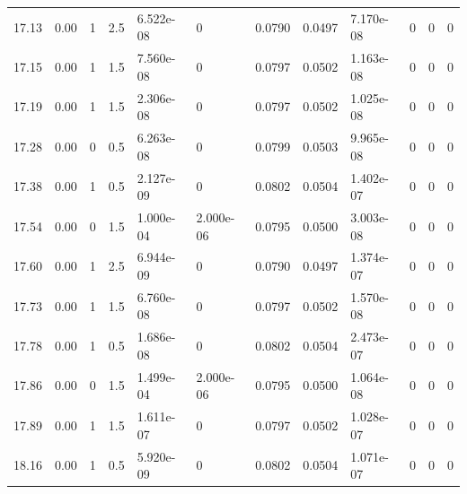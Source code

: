 \documentclass[preview]{standalone}
\begin{document}
{{{{\begin{tabular}{L{1.2cm}C{1.2cm} C{0.3cm}C{0.5cm} C{1.4cm}C{1.4cm} C{1.4cm}C{1.4cm} C{1.6cm}C{1.6cm} C{1.6cm}C{1.6cm}}
  17.13  &  0.00  & 1     & 2.5 &  6.522e-08  & 0  &  0.0790&   0.0497& 7.170e-08 & 0   &  0 & 0  \\ 
  17.15  &  0.00  & 1     & 1.5 &  7.560e-08  & 0  &  0.0797&   0.0502& 1.163e-08 & 0   &  0 & 0  \\ 
  17.19  &  0.00  & 1     & 1.5 &  2.306e-08  & 0  &  0.0797&   0.0502& 1.025e-08 & 0   &  0 & 0  \\ 
  17.28  &  0.00  & 0     & 0.5 &  6.263e-08  & 0  &  0.0799&   0.0503& 9.965e-08 & 0   &  0 & 0  \\ 
  17.38  &  0.00  & 1     & 0.5 &  2.127e-09  & 0  &  0.0802&   0.0504& 1.402e-07 & 0   &  0 & 0  \\ 
  17.54  &  0.00  & 0     & 1.5 &  1.000e-04  & 2.000e-06  &  0.0795&   0.0500& 3.003e-08 & 0   &  0 & 0  \\ 
  17.60  &  0.00  & 1     & 2.5 &  6.944e-09  & 0  &  0.0790&   0.0497& 1.374e-07 & 0   &  0 & 0  \\ 
  17.73  &  0.00  & 1     & 1.5 &  6.760e-08  & 0  &  0.0797&   0.0502& 1.570e-08 & 0   &  0 & 0  \\ 
  17.78  &  0.00  & 1     & 0.5 &  1.686e-08  & 0  &  0.0802&   0.0504& 2.473e-07 & 0   &  0 & 0  \\ 
  17.86  &  0.00  & 0     & 1.5 &  1.499e-04  & 2.000e-06  &  0.0795&   0.0500& 1.064e-08 & 0   &  0 & 0  \\ 
  17.89  &  0.00  & 1     & 1.5 &  1.611e-07  & 0  &  0.0797&   0.0502& 1.028e-07 & 0   &  0 & 0  \\ 
  18.16  &  0.00  & 1     & 0.5 &  5.920e-09  & 0  &  0.0802&   0.0504& 1.071e-07 & 0   &  0 & 0  \\ 
\hline 
\end{tabular} 

}}}}
\end{document}
